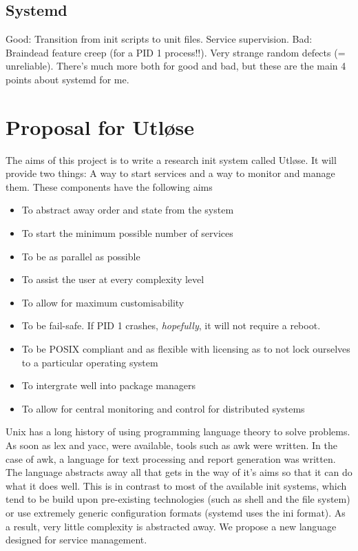 \documentclass{article}
\begin{document}
\subsection{Systemd}
Good: Transition from init scripts to unit files. Service supervision. Bad: Braindead
feature creep (for a PID 1 process!!). Very strange random defects (= unreliable). There's
much more both for good and bad, but these are the main 4 points about systemd for me.

\section{Proposal for Utløse}
The aims of this project is to write a research init system called Utløse. It will provide
two things: A way to start services and a way to monitor and manage them.
These components have the following aims
\begin{itemize}
    \item To abstract away order and state from the system
    \item To start the minimum possible number of services
    \item To be as parallel as possible
    \item To assist the user at every complexity level
    \item To allow for maximum customisability
    \item To be fail-safe. If PID 1 crashes, \textit{hopefully}, it will not require a reboot.
    \item To be POSIX compliant and as flexible with licensing as to not lock ourselves to a particular operating system
    \item To intergrate well into package managers
    \item To allow for central monitoring and control for distributed systems
\end{itemize}

Unix has a long history of using programming language theory to solve problems. As soon as
lex and yacc, were available, tools such as awk were written. In the case of awk, a language
for text processing and report generation was written. The language abstracts away all that
gets in the way of it's aims so that it can do what it does well. This is in contrast to most
of the available init systems, which tend to be build upon pre-existing technologies (such
as shell and the file system) or use extremely generic configuration formats (systemd uses
the ini format). As a result, very little complexity is abstracted away. We propose a
new language designed for service management.
\end{document}
